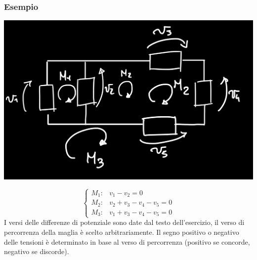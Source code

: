 \documentclass{article}
\begin{document}
\subsubsection*{Esempio}
\begin{center}
    \includegraphics[scale=0.37]{Image/Esempio1-Circuiiti.png}
\end{center}
\[
\begin{cases}
    M_1: & v_1 - v_2 = 0\\
    M_2: & v_2+v_3-v_4-v_5 = 0\\
    M_3: & v_1 + v_3 - v_4 - v_5=0
\end{cases}
\]
I versi delle differenze di potenziale sono date dal testo dell'esercizio, il verso di percorrenza
della maglia è scelto arbitrariamente. Il segno positivo o negativo delle tensioni è determinato in base al verso di percorrenza (positivo se concorde, negativo se discorde).
\end{document}
